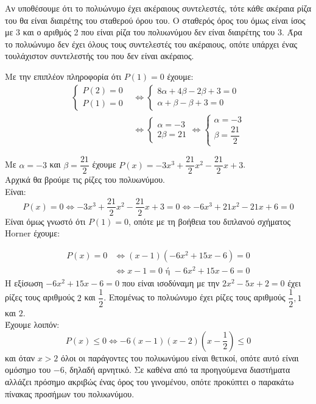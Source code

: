 \begin{alist}
\item Αν υποθέσουμε ότι το πολυώνυμο έχει ακέραιους συντελεστές, τότε κάθε ακέραια ρίζα του θα είναι διαιρέτης του σταθερού όρου του. Ο σταθερός όρος του όμως είναι ίσος με 3 και ο αριθμός 2 που είναι ρίζα του πολυωνύμου δεν είναι διαιρέτης του 3. Άρα το πολυώνυμο δεν έχει όλους τους συντελεστές του ακέραιους, οπότε υπάρχει ένας τουλάχιστον συντελεστής του που δεν είναι ακέραιος.
\item Με την επιπλέον πληροφορία ότι $P(1) = 0$ έχουμε:
\begin{align*}
\begin{cases} P(2) = 0 \\ P(1) = 0 \end{cases} &\Leftrightarrow \begin{cases} 8\alpha + 4\beta - 2\beta + 3 = 0 \\ \alpha + \beta - \beta + 3 = 0 \end{cases} \\
&\Leftrightarrow \begin{cases} \alpha = -3 \\ 2\beta = 21 \end{cases} \Leftrightarrow \begin{cases} \alpha = -3 \\ \beta = \dfrac{21}{2} \end{cases}
\end{align*}
\item Με $\alpha = -3$ και $\beta = \dfrac{21}{2}$ έχουμε $P(x) = -3x^3 + \dfrac{21}{2}x^2 - \dfrac{21}{2}x + 3$. \\
Αρχικά θα βρούμε τις ρίζες του πολυωνύμου. \\
Είναι: 
\[P(x) = 0 \Leftrightarrow -3x^3 + \frac{21}{2}x^2 - \frac{21}{2}x + 3 = 0 \Leftrightarrow -6x^3 + 21x^2 - 21x + 6 = 0\]
Είναι όμως γνωστό ότι $P(1) = 0$, οπότε με τη βοήθεια του διπλανού σχήματος Horner έχουμε:
\begin{center}
\end{center}
\begin{align*}
P(x) = 0 &\Leftrightarrow (x-1)(-6x^2 + 15x - 6) = 0 \\
&\Leftrightarrow x - 1 = 0 \text{ ή } -6x^2 + 15x - 6 = 0
\end{align*}
Η εξίσωση $-6x^2 + 15x - 6 = 0$ που είναι ισοδύναμη με την $2x^2 - 5x + 2 = 0$ έχει ρίζες τους αριθμούς $2$ και $\dfrac{1}{2}$. Επομένως το πολυώνυμο έχει ρίζες τους αριθμούς $\dfrac{1}{2}, 1$ και $2$. \\
Έχουμε λοιπόν: 
\[P(x) \le 0 \Leftrightarrow -6(x-1)(x-2)\left(x-\frac{1}{2}\right) \le 0\]
και όταν $x>2$ όλοι οι παράγοντες του πολυωνύμου είναι θετικοί, οπότε αυτό είναι ομόσημο του $-6$, δηλαδή αρνητικό. Σε καθένα από τα προηγούμενα διαστήματα αλλάζει πρόσημο ακριβώς ένας όρος του γινομένου, οπότε προκύπτει ο παρακάτω πίνακας προσήμων του πολυωνύμου.
\begin{center}
\begin{tabular}{|c|c|c|c|c|c|c|c|}


\end{tabular}
\end{center}
\end{alist}
